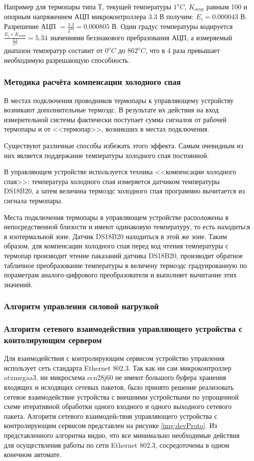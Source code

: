 Например для термопары типа Т, текущей температуры $1^oC$, $K_{amp}$ равным 100 и опорным напряжением
АЦП микроконтроллера 3.3 В получим:
$E_i = 0.000043$ В. Разрешение АЦП $= \frac{3.3}{2^{12}} = 0.000805$ В. Один градус температуры
кодируется $\frac{E_i \times{} K_{amp}}{\frac{3.3}{2^{12}}} = 5.34 $ значениями
беззнакового пребразования АЦП, а измеряемый диапазон температур составит от $0^oC$ до $862^oC$,
что в 4 раза превышает необходимую разрешающую способность.

\subsubsection{Методика расчёта компенсации холодного спая}
В местах подключения проводников термопары к управляющему устройству возникают дополнительные термоэдс.
В результате их действия на вход измерительной системы фактически поступает сумма сигналов от рабочей
термопары и от <<термопар>>, возникших в местах подключения.

Существуют различные способы избежать этого эффекта. Самым очевидным из них является поддержание
температуры холодного спая постоянной.

В управляющем устройстве используется техника <<компенсации холодного спая>>: температура холодного спая
измеряется датчиком температуры DS18B20, а затем величина термоэдс холодного спая программно
вычитается из сигнала термопары.

Места подключения термопары в управляющем устройстве расположены в непосредственной близости и имеют одинаковую
температуру, то есть находиться в изотермальной зоне. Датчик DS18B20 находиться в этой же зоне. Таким образом,
для компенсации холодного спая перед код чтения температуры с термопар производит чтение паказаний датчика DS18B20,
производит обратное табличное преобразование температуры в величену термоэдс градуированную по пораметрам
аналого-цифрового преобразователя и выполняет вычитание этих значений.

\subsubsection{Алгоритм управления силовой нагрузкой}

\subsubsection{Алгоритм сетевого взаимодействия управляющего устройства
с контолирующим сервером}
Для взаимодействия с контролирующим сервисом устройство управления использует сеть
стандарта Ethernet 802.3. Так как ни сам микроконтроллер at\-x\-mega\-a3, ни микросхема
ecn28j60 не имеют большого буфера хранения входящих и исходящих сетевых пакетов,
было принято решение реализовать сетевое взаимодействие устройства с внешними устройствами
по упрощенной схеме итеративной обработки одного входного и одного выходного сетевого
пакета. Алгоритм сетевого взаимодейcтвия управляющего устройства с контролирующим сервисом представлен
на рисунке \ref{img:devProto}. Из представленного алгоритма видно, что все минимально необходимые
действия для осуществления работы по сети Ethernet 802.3, сосредоточены в одном конечном автомате.

